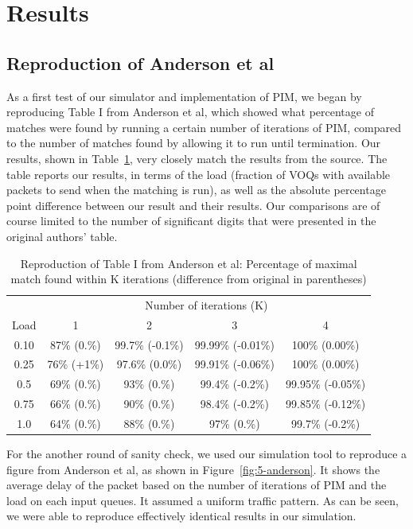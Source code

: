 \section{Results}
\subsection{Reproduction of Anderson et al}
As a first test of our simulator and implementation of PIM, we began by reproducing Table I from Anderson et al, which showed what percentage of matches were found by running a certain number of iterations of PIM, compared to the number of matches found by allowing it to run until termination. Our results, shown in Table~\ref{tab:anderson_I}, very closely match the results from the source. The table reports our results, in terms of the load (fraction of VOQs with available packets to send when the matching is run), as well as the absolute percentage point difference between our result and their results. Our comparisons are of course limited to the number of significant digits that were presented in the original authors' table.

\begin{table}[]
\caption{Reproduction of Table I from Anderson et al: Percentage of maximal match found within K iterations (difference from original in parentheses)}
\hskip-1.2cm\begin{tabular}{@{}ccccc@{}}
     & \multicolumn{4}{c}{Number of iterations (K)} \\ \cmidrule(l){2-5} 
Load & 1         & 2        & 3         & 4         \\ \midrule
0.10 & 87\% (0.\%) & 99.7\% (-0.1\%) & 99.99\% (-0.01\%) & 100\% (0.00\%) \\
0.25 & 76\% (+1\%) & 97.6\% (0.0\%)  & 99.91\% (-0.06\%) & 100\% (0.00\%) \\
0.5  & 69\% (0.\%) & 93\% (0.\%)     & 99.4\% (-0.2\%)   & 99.95\% (-0.05\%) \\
0.75 & 66\% (0.\%) & 90\% (0.\%)     & 98.4\% (-0.2\%)   & 99.85\% (-0.12\%) \\
1.0  & 64\% (0.\%) & 88\% (0.\%)     & 97\% (0.\%)       & 99.7\% (-0.2\%)  
\end{tabular}
\label{tab:anderson_I}
\end{table}

For the another round of sanity check, we used our simulation tool to reproduce a figure from Anderson et al, as shown in Figure~\ref{fig:5-anderson}. It shows the average delay of the packet based on the number of iterations of PIM and the load on each input queues. It assumed a uniform traffic pattern. As can be seen, we were able to reproduce effectively identical results in our simulation.

